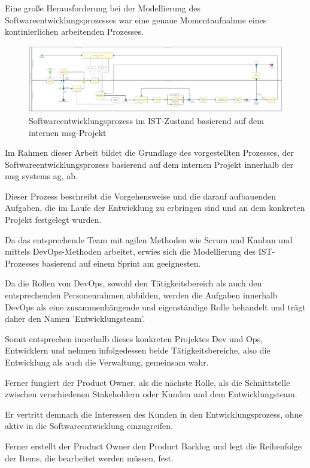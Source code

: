 Eine große Herausforderung bei der Modellierung des Softwareentwicklungsprozesses war eine genaue Momentaufnahme eines kontinierlichen arbeitenden Prozesses. 

\begin{figure}[p]
    \centering
    \includegraphics[angle=90, scale=0.6]{Bilder/IST-Prozess_neu.png}
    \caption{Softwareentwicklungsprozess im IST-Zustand basierend auf dem internen msg-Projekt}
\end{figure}

Im Rahmen dieser Arbeit bildet die Grundlage des vorgestellten Prozesses, der Softwareentwicklungsprozess basierend auf dem internen Projekt innerhalb der msg systems ag, ab.

Dieser Prozess beschreibt die Vorgehensweise und die darauf aufbauenden Aufgaben, die im Laufe der Entwicklung zu erbringen sind und an dem konkreten Projekt festgelegt wurden.

Da das entsprechende Team mit agilen Methoden wie Scrum und Kanban und mittels DevOps-Methoden arbeitet, erwies sich die Modellierung des IST-Prozesses basierend auf einem Sprint am geeignesten. 

Da die Rollen von DevOps, sowohl den Tätigkeitsbereich als auch den entsprechenden Personenrahmen abbilden, werden die Aufgaben innerhalb DevOps als eine zusammenhängende und eigenständige Rolle behandelt und trägt daher den Namen 'Entwicklungsteam'.

Somit entsprechen innerhalb dieses konkreten Projektes Dev und Ops, Entwicklern und nehmen infolgedessen beide Tätigkeitsbereiche, also die Entwicklung als auch die Verwaltung, gemeinsam wahr.

Ferner fungiert der Product Owner, als die nächste Rolle, als die Schnittstelle zwischen verschiedenen Stakeholdern oder Kunden und dem Entwicklungsteam. 

Er vertritt demnach die Interessen des Kunden in den Entwicklungsprozess, ohne aktiv in die Softwareentwicklung einzugreifen.

Ferner erstellt der Product Owner den Product Backlog und legt die Reihenfolge der Items, die bearbeitet werden müssen, fest. 

